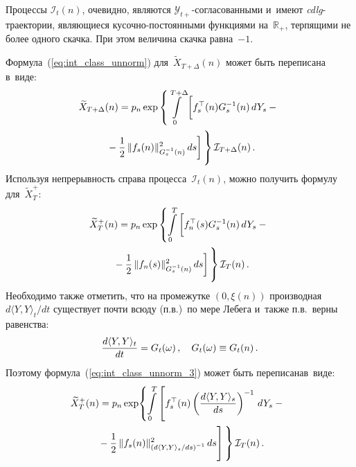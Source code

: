 \begin{multicols}{2}
  Процессы $\mathcal{I}_t(n)$, очевидно, являются $\mathcal{Y}_{t+}$-со\-гла\-со\-ван\-ны\-ми 
  и~имеют \mbox{\textit{c{\!}dl{\!}g}}-тра\-ек\-то\-рии, 
  явля\-ющи\-еся ку\-соч\-но-по\-сто\-ян\-ны\-ми функциями на~$\mathbb{R}_+$, 
  терпящими не более одного скачка. При этом величина скачка равна~$-1$.

  Формула~(\ref{eq:int_class_unnorm}) для~$\widetilde{X}_{T+\Delta}(n)$ 
  может быть переписана в~виде:
  \begin{multline*}
  \widetilde{X}_{T+\Delta}(n)=  p_n\exp
 \left\{\int\limits_0^{T+\Delta}   \left[\vphantom{\fr{1}{2}}
     f_s^{\top}(n)G_s^{-1}(n)\,dY_s - {}\right.\right.\\
\left.\left.     {}-\fr{1}{2}\,\|f_s(n)\|^2_{G_s^{-1}(n)}\,ds
        \right]
        \vphantom{\int\limits_0^{T+\Delta}}
 \right\}\mathcal{I}_{T+\Delta}(n)\,.
  \end{multline*}
  Используя
  непрерывность справа процесса~$\mathcal{I}_t(n)$, можно получить 
  формулу для~$\widetilde{X}_{T}^+$:
  \begin{multline}
  \widetilde{X}_T^+(n)=  p_n\exp  \left\{\int\limits_0^{T}
   \left[ \vphantom{\fr{1}{2}} 
   f_n^{\top}(s)G_s^{-1}(n)\,dY_s -{}\right.\right.\\
\left.\left.   {}-
\fr{1}{2}\,\|f_n(s)\|^2_{G_s^{-1}(n)}\,ds
        \right]
        \vphantom{\int\limits_0^{T}}
 \right\}\mathcal{I}_{T}(n)\,.
 \label{eq:int_class_unnorm_3}
  \end{multline}
 Необходимо также отметить, что на промежутке $(0,\xi(n))$ производная 
 ${d\langle Y,Y\rangle_t}/{dt}$ существует почти всюду (п.в.)\ по мере Лебега и~также 
 п.в.\ верны равенства:
 \begin{equation*}
 \displaystyle\frac{\displaystyle d\langle Y,Y\rangle_t\mathstrut}{\displaystyle dt\mathstrut}=G_t(\omega)\,, \quad
  G_t(\omega) \equiv G_t(n)\,.
  \end{equation*}
  Поэтому формула~(\ref{eq:int_class_unnorm_3}) может быть переписана\linebreak в~виде:
 \begin{multline}
  \hspace*{-2.2pt}\widetilde{X}_T^+(n)=  p_n\exp \! \left\{\int\limits_0^{T}
   \left[  \vphantom{\int\limits_0^{T}}
   f_s^{\top}(n)\left( 
   \fr{d\langle Y,Y\rangle_s}{ds} \right)^{-1}\,dY_s -{}\right.\right.\\
\left.\left.   {}-
\fr{1}{2}\,\|f_s(n)\|^2_{\left( {d\langle Y,Y\rangle_s}/{ds} \right)^{-1}}\,ds
    \vphantom{\int\limits_0^{T}}    \right]  
        \vphantom{\int\limits_0^{T}}
        \right\}\mathcal{I}_{T}(n)\,.
 \label{eq:int_class_unnorm_4}
  \end{multline}


\end{multicols}

